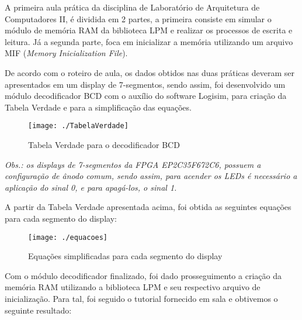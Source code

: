 \documentclass[12pt, a4paper]{article}
\begin{document}
    \par A primeira aula prática da disciplina de Laboratório de Arquitetura de Computadores II, é dividida em 2 partes, a primeira consiste em simular o módulo de memória RAM da biblioteca LPM e realizar os processos de escrita e leitura. Já a segunda parte, foca em inicializar a memória utilizando um arquivo MIF (\textit{Memory Inicialization File}).
    
    \vspace{\baselineskip}

	\par De acordo com o roteiro de aula, os dados obtidos nas duas práticas deveram ser apresentados em um display de 7-segmentos, sendo assim, foi desenvolvido um módulo decodificador BCD com o auxílio do software Logisim, para criação da Tabela Verdade e para a simplificação das equações.
	
	\vspace{\baselineskip}
    
    \begin{figure}[H]
    	\centering
    	\texttt{[image: ./TabelaVerdade]}
    	\caption{Tabela Verdade para o decodificador BCD}
    	\label{fig: tabela verdade}
    \end{figure}
    
    \par \textit{Obs.: os displays de 7-segmentos da FPGA EP2C35F672C6, possuem a configuração de ânodo comum, sendo assim, para acender os LEDs é necessário a aplicação do sinal 0, e para apagá-los, o sinal 1.}

    \vspace{\baselineskip}
    
    \par A partir da Tabela Verdade apresentada acima, foi obtida as seguintes equações para cada segmento do display:
    
    \begin{figure}[H]
    	\centering
    	\texttt{[image: ./equacoes]}
    	\caption{Equações simplificadas para cada segmento do display}
    	\label{fig: equacoes}
    \end{figure}

    \vspace{\baselineskip}
    
    \par Com o módulo decodificador finalizado, foi dado prosseguimento a criação da memória RAM utilizando a biblioteca LPM e seu respectivo arquivo de inicialização. Para tal, foi seguido o tutorial fornecido em sala e obtivemos o seguinte resultado:
    
\end{document}
